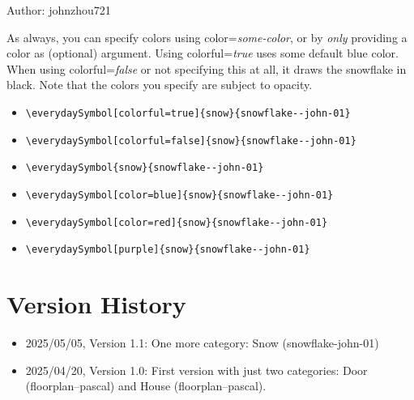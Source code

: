 \documentclass{article}
\begin{document}
Author: johnzhou721
\medskip

As always, you can specify colors using color=\textit{some-color}, or by \emph{only} providing a color as (optional) argument. Using colorful=\textit{true} uses some default blue color. When using colorful=\textit{false} or not specifying this at all, it draws the snowflake in black. Note that the colors you specify are subject to opacity.

\begin{itemize}
  \item \verb|\everydaySymbol[colorful=true]{snow}{snowflake--john-01}| \dotfill\ 
  \item \verb|\everydaySymbol[colorful=false]{snow}{snowflake--john-01}| \dotfill\ 
  \item \verb|\everydaySymbol{snow}{snowflake--john-01}| \dotfill\ 
  \item \verb|\everydaySymbol[color=blue]{snow}{snowflake--john-01}| \dotfill\ 
  \item \verb|\everydaySymbol[color=red]{snow}{snowflake--john-01}| \dotfill\ 
  \item \verb|\everydaySymbol[purple]{snow}{snowflake--john-01}| \dotfill\ 
\end{itemize}



\section*{Version History}

\begin{itemize}
  \item 2025/05/05, Version 1.1: One more category: Snow (snowflake-john-01)
  \item 2025/04/20, Version 1.0: First version with just two categories: Door (floorplan--pascal) and House (floorplan--pascal).
\end{itemize}
\end{document}
